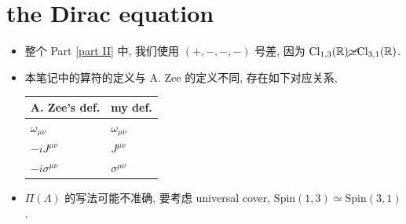 \chapter{the Dirac equation}
\begin{itemize}
	\item 整个 Part \ref{part II} 中, 我们使用 $(+, -, -, -)$ 号差, 因为 $\mathrm{Cl}_{1, 3}(\mathbb{R}) \cancel{\simeq} \mathrm{Cl}_{3, 1}(\mathbb{R})$.
	
	\item 本笔记中的算符的定义与 A. Zee 的定义不同, 存在如下对应关系,
	
	\begin{center}
		\begin{tabularx}{\linewidth}{KK}
			\toprule 
			A. Zee's def. & my def. \\
			\midrule 
			$\omega_{\mu \nu}$ & $\omega_{\mu \nu}$ \\
			$- i J^{\mu \nu}$ & $J^{\mu \nu}$ \\
			$- i \sigma^{\mu \nu}$ & $\sigma^{\mu \nu}$ \\
			\bottomrule
		\end{tabularx}
	\end{center}
	
	\item $\Pi(\Lambda)$ 的写法可能不准确, 要考虑 universal cover, $\mathrm{Spin}(1, 3) \simeq \mathrm{Spin}(3, 1)$.
\end{itemize}

